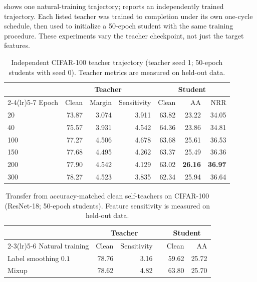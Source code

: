  shows one natural-training trajectory; 
reports an independently trained trajectory. Each listed teacher was trained to completion under
its own one-cycle schedule, then used to initialize a 50-epoch student with the same training
procedure. These experiments vary the teacher checkpoint, not just the target features.

\begin{table}[!htbp]
  \centering \small \setlength{\tabcolsep}{4pt}
  \caption{Independent CIFAR-100 teacher trajectory (teacher seed 1; 50-epoch students with
  seed 0). Teacher metrics are measured on held-out data.}
  \label{tab:teacherladder_seed1}
  \begin{tabular}{lrrrrrr}
    \toprule
    & \multicolumn{3}{c}{Teacher} & \multicolumn{3}{c}{Student} \\
    \cmidrule(lr){2-4}\cmidrule(lr){5-7}
    Epoch & Clean & Margin & Sensitivity & Clean & AA & NRR \\
    \midrule
    20       & 73.87 & 3.074 & 3.911 & 63.82 & 23.22 & 34.05 \\
    40       & 75.57 & 3.931 & 4.542 & 64.36 & 23.86 & 34.81 \\
    100      & 77.27 & 4.506 & 4.678 & 63.68 & 25.61 & 36.53 \\
    150      & 77.68 & 4.495 & 4.262 & 63.37 & 25.49 & 36.36 \\
    200      & 77.90 & 4.542 & 4.129 & 63.02 & \textbf{26.16} & \textbf{36.97} \\
    300      & 78.27 & 4.523 & 3.835 & 62.34 & 25.94 & 36.64 \\
    \bottomrule
  \end{tabular}
\end{table}

\begin{table}[!htbp]
  \centering \small \setlength{\tabcolsep}{4.5pt}
  \caption{Transfer from accuracy-matched clean self-teachers on CIFAR-100
  (ResNet-18; 50-epoch students). Feature sensitivity is measured on held-out data.}
  \label{tab:matchedteacher}
  \begin{tabular}{lrrcrr}
    \toprule
    & \multicolumn{2}{c}{Teacher} && \multicolumn{2}{c}{Student} \\
    \cmidrule(lr){2-3}\cmidrule(lr){5-6}
    Natural training & Clean & Sensitivity && Clean & AA \\
    \midrule
    Label smoothing $0.1$ & 78.76 & 3.16 && 59.62 & 25.72 \\
    Mixup & 78.62 & 4.82 && 63.80 & 25.70 \\
    \bottomrule
  \end{tabular}
\end{table}

